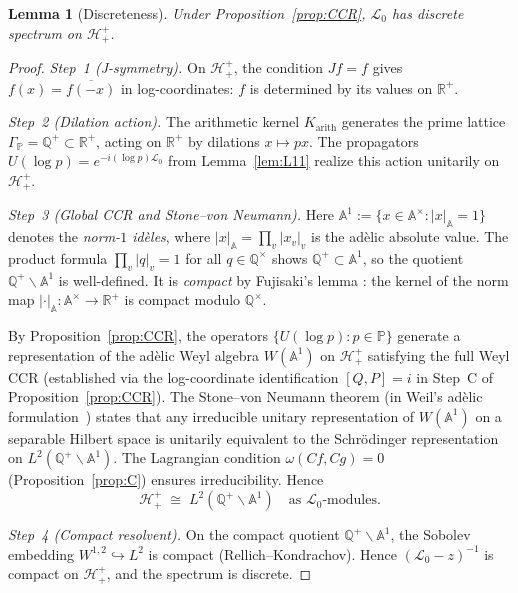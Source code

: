 \documentclass[12pt,a4paper]{article}
\newtheorem{lemma}[theorem]{Lemma}
\theoremstyle{remark}
\begin{document}
\begin{lemma}[Discreteness]\label{lem:discrete}
Under Proposition~\ref{prop:CCR}, $\mathcal{L}_0$ has discrete spectrum
on $\mathcal{H}^+_+$.
\end{lemma}
\begin{proof}
\emph{Step~1 (J-symmetry).}
On $\mathcal{H}^+_+$, the condition $Jf=f$ gives
$f(x)=\overline{f(-x)}$ in log-coordinates: $f$ is determined by
its values on $\mathbb{R}^+$.

\emph{Step~2 (Dilation action).}
The arithmetic kernel $K_{\mathrm{arith}}$ generates the prime lattice
$\Gamma_\mathbb{P}=\mathbb{Q}^+\subset\mathbb{R}^+$,
acting on $\mathbb{R}^+$ by dilations $x\mapsto px$.
The propagators $U(\log p)=e^{-i(\log p)\mathcal{L}_0}$
from Lemma~\ref{lem:L11} realize this action unitarily on $\mathcal{H}^+_+$.

\emph{Step~3 (Global CCR and Stone--von Neumann).}
Here $\mathbb{A}^1 := \{x\in\mathbb{A}^\times : |x|_{\mathbb{A}}=1\}$
denotes the \emph{norm-$1$ idèles}, where
$|x|_{\mathbb{A}}=\prod_v|x_v|_v$ is the adèlic absolute value.
The product formula $\prod_v|q|_v=1$ for all $q\in\mathbb{Q}^\times$
shows $\mathbb{Q}^+\subset\mathbb{A}^1$, so the quotient
$\mathbb{Q}^+\backslash\mathbb{A}^1$ is well-defined.
It is \emph{compact} by Fujisaki's lemma \cite{Weil1952}:
the kernel of the norm map $|\cdot|_\mathbb{A}:\mathbb{A}^\times\to\mathbb{R}^+$
is compact modulo $\mathbb{Q}^\times$.

By Proposition~\ref{prop:CCR}, the operators
$\{U(\log p):p\in\mathbb{P}\}$ generate a representation of the
adèlic Weyl algebra $W(\mathbb{A}^1)$ on $\mathcal{H}^+_+$
satisfying the full Weyl CCR (established via the log-coordinate
identification $[Q,P]=i$ in Step~C of Proposition~\ref{prop:CCR}).
The Stone--von Neumann theorem
(in Weil's adèlic formulation~\cite{Weil1964}) states that any
irreducible unitary representation of $W(\mathbb{A}^1)$ on a
separable Hilbert space is unitarily equivalent to the
Schrödinger representation on $L^2(\mathbb{Q}^+\backslash\mathbb{A}^1)$.
The Lagrangian condition $\omega(Cf,Cg)=0$
(Proposition~\ref{prop:C}) ensures irreducibility.
Hence
\[
  \mathcal{H}^+_+ \;\cong\; L^2(\mathbb{Q}^+\backslash\mathbb{A}^1)
  \quad\text{as }\mathcal{L}_0\text{-modules.}
\]

\emph{Step~4 (Compact resolvent).}
On the compact quotient $\mathbb{Q}^+\backslash\mathbb{A}^1$,
the Sobolev embedding $W^{1,2}\hookrightarrow L^2$ is compact
(Rellich--Kondrachov).
Hence $(\mathcal{L}_0-z)^{-1}$ is compact on $\mathcal{H}^+_+$,
and the spectrum is discrete.
\end{proof}
\end{document}
